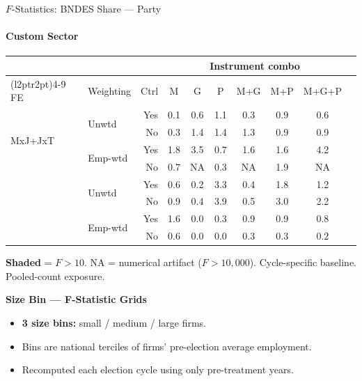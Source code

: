 \documentclass[aspectratio=169,10pt]{beamer}
\begin{document}
\begin{frame}[t]{$F$-Statistics: BNDES Share --- Party}
\framesubtitle{Custom Sector}
\begin{center}
\footnotesize
\setlength{\tabcolsep}{3.5pt}
\renewcommand{\arraystretch}{1.05}
\begin{tabular}{@{}llrccccccc@{}}
\toprule
 & & & \multicolumn{6}{c}{Instrument combo} \\
\cmidrule(l{2pt}r{2pt}){4-9}
FE & Weighting & Ctrl & M & G & P & M+G & M+P & M+G+P \\
\midrule
  \multirow{4}{*}{MxJ+JxT} & \multirow{2}{*}{Unwtd} & Yes & 0.1 & 0.6 & 1.1 & 0.3 & 0.9 & 0.6 \\
   &  & No & 0.3 & 1.4 & 1.4 & 1.3 & 0.9 & 0.9 \\
   & \multirow{2}{*}{Emp-wtd} & Yes & 1.8 & 3.5 & 0.7 & 1.6 & 1.6 & 4.2 \\
   &  & No & 0.7 & NA & 0.3 & NA & 1.9 & NA \\
\addlinespace[5pt]
  \multirow{4}{*}{MxJ+MxT} & \multirow{2}{*}{Unwtd} & Yes & 0.6 & 0.2 & 3.3 & 0.4 & 1.8 & 1.2 \\
   &  & No & 0.9 & 0.4 & 3.9 & 0.5 & 3.0 & 2.2 \\
   & \multirow{2}{*}{Emp-wtd} & Yes & 1.6 & 0.0 & 0.3 & 0.9 & 0.9 & 0.8 \\
   &  & No & 0.6 & 0.0 & 0.0 & 0.3 & 0.3 & 0.2 \\
\bottomrule
\end{tabular}
\end{center}
{\scriptsize \colorbox{pass}{\textbf{Shaded}} = $F>10$. NA = numerical artifact ($F>10{,}000$). Cycle-specific baseline. Pooled-count exposure.}
\end{frame}


\begin{frame}[plain]
\begin{center}
{\Large\textbf{Size Bin --- F-Statistic Grids}}\\[0.5em]
\end{center}
\small
\begin{itemize}
\item \textbf{3 size bins:} small / medium / large firms.
\item Bins are national terciles of firms' pre-election average employment.
\item Recomputed each election cycle using only pre-treatment years.
\end{itemize}
\vfill
\end{frame}
\end{document}

